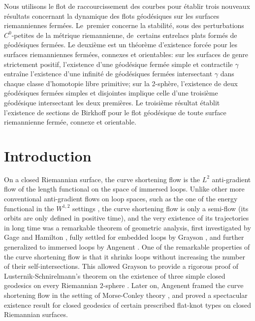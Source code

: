 \documentclass[JEP,XML,SOM,Unicode,NoFloatCountersInSection,published]{cedram}
\theoremstyle{plain}
\theoremstyle{definition}
\begin{document}

\begin{altabstract}
Nous utilisons le flot de raccourcissement des courbes pour établir trois nouveaux résultats concernant la dynamique des flots géodésiques sur les surfaces riemanniennes fermées. Le~premier concerne la stabilité, sous des perturbations $C^0$-petites de la métrique riemannienne, de~certains entrelacs plats formés de géodésiques fermées. Le deuxième est un théorème d'existence forcée pour les surfaces riemanniennes fermées, connexes et orientables: sur les surfaces de genre strictement positif, l'existence d'une géodésique fermée simple et contractile $\gamma$ entraîne l'existence d'une infinité de géodésiques fermées intersectant $\gamma$ dans chaque classe d'homotopie libre primitive; sur la 2-sphère, l'existence de deux géodésiques fermées simples et disjointes implique celle d'une troisième géodésique intersectant les deux premières. Le troisième résultat établit l’existence de sections de Birkhoff pour le flot géodésique de toute surface riemannienne fermée, connexe et orientable.
\end{altabstract}

\maketitle
\vspace*{-\baselineskip}
\tableofcontents

\mainmatter
\section{Introduction}

On a closed Riemannian surface, the curve shortening flow is the $L^2$ anti-gradient flow of the length functional on the space of immersed loops. Unlike other more conventional anti-gradient flows on loop spaces, such as the one of the energy functional in the $W^{1,2}$ settings \cite{Klingenberg:1978aa}, the curve shortening flow is only a semi-flow (\ie its orbits are only defined in positive time), and the very existence of its trajectories in long time was a remarkable theorem of geometric analysis, first investigated by Gage \cite{Gage:1983aa,Gage:1984aa, Gage:1990aa} and Hamilton \cite{Gage:1986aa}, fully settled for embedded loops by Grayson \cite{Grayson:1989aa}, and further generalized to immersed loops by Angenent \cite{Angenent:1990aa, Angenent:1991aa}. One of the remarkable properties of the curve shortening flow is that it shrinks loops without increasing the number of their self-intersections. This allowed Grayson to provide a rigorous proof of Lusternik-Schnirelmann's theorem on the existence of three simple closed geodesics on every Riemannian $2$-sphere \cite{Grayson:1989aa, Mazzucchelli:2018aa}. Later on, Angenent \cite{Angenent:2005aa} framed the curve shortening flow in the setting of Morse-Conley theory \cite{Conley:1978aa}, and proved a spectacular existence result for closed geodesics of certain prescribed flat-knot types on closed Riemannian surfaces.
\end{document}
